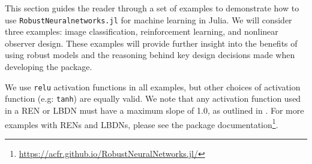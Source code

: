 This section guides the reader through a set of examples to demonstrate how to use \verb|RobustNeuralnetworks.jl| for machine learning in Julia. We will consider three examples: image classification, reinforcement learning, and nonlinear observer design. These examples will provide further insight into the benefits of using robust models and the reasoning behind key design decisions made when developing the package.

We use \verb|relu| activation functions in all examples, but other choices of activation function (e.g: \verb|tanh|) are equally valid. We note that any activation function used in a REN or LBDN must have a maximum slope of 1.0, as outlined in \cite{Revay++2021b,Wang+Manchester2023}. For more examples with RENs and LBDNs, please see the package documentation\footnote{\url{https://acfr.github.io/RobustNeuralNetworks.jl/}}.